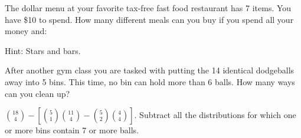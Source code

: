 \begin{questions}

\question The dollar menu at your favorite tax-free fast food restaurant has 7 items.  You have \$10 to spend. How many different meals can you buy if you spend all your money and: 

  \begin{answer}
  Hint: Stars and bars.
  \end{answer}





\question After another gym class you are tasked with putting the 14 identical dodgeballs away into 5 bins.  This time, no bin can hold more than 6 balls. How many ways can you clean up?


	\begin{answer}
 ${18 \choose 4} - \left[ {5 \choose 1}{11 \choose 4} - {5 \choose 2}{4 \choose 4}\right]$.  Subtract all the distributions for which one or more bins contain 7 or more balls.  %
	\end{answer}





\end{questions}
